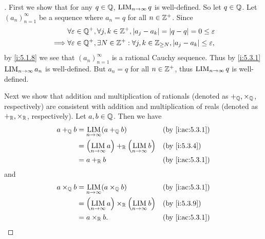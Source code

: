 \begin{proof}[]
  First we show that for any \(q \in \mathbb{Q}\), \(\operatorname*{LIM}_{n \to \infty} q\) is well-defined.
  So let \(q \in \mathbb{Q}\).
  Let \((a_n)_{n = 1}^\infty\) be a sequence where \(a_n = q\) for all \(n \in \mathbb{Z}^+\).
  Since
  \begin{align*}
             & \forall \varepsilon \in \mathbb{Q}^+, \forall j, k \in \mathbb{Z}^+, \left\lvert a_j - a_k\right\rvert = \left\lvert q - q\right\rvert = 0 \leq \varepsilon            \\
    \implies & \forall \varepsilon \in \mathbb{Q}^+, \exists N \in \mathbb{Z}^+ : \forall j, k \in \mathbb{Z}_{\geq N}, \left\lvert a_j - a_k\right\rvert \leq \varepsilon,
  \end{align*}
  by \cref{i:5.1.8} we see that \((a_n)_{n = 1}^\infty\) is a rational Cauchy sequence.
  Thus by \cref{i:5.3.1} \(\operatorname*{LIM}_{n \to \infty} a_n\) is well-defined.
  But \(a_n = q\) for all \(n \in \mathbb{Z}^+\), thus \(\operatorname*{LIM}_{n \to \infty} q\) is well-defined.

  Next we show that addition and multiplication of rationals (denoted as \(+_{\mathbb{Q}}, \times_{\mathbb{Q}}\), respectively) are consistent with addition and multiplication of reals (denoted as \(+_{\mathbb{R}}, \times_{\mathbb{R}}\), respectively).
  Let \(a, b \in \mathbb{Q}\).
  Then we have
  \begin{align*}
    a +_\Q b & = \LIM_{n \to \infty} (a +_\Q b)                             &  & \by{i:ac:5.3.1} \\
             & = \pa{\LIM_{n \to \infty} a} +_\R \pa{\LIM_{n \to \infty} b} &  & \by{i:5.3.4}    \\
             & = a +_\R b                                                   &  & \by{i:ac:5.3.1}
  \end{align*}
  and
  \begin{align*}
    a \times_\Q b & = \LIM_{n \to \infty} (a \times_\Q b)                             &  & \by{i:ac:5.3.1} \\
                  & = \pa{\LIM_{n \to \infty} a} \times_\R \pa{\LIM_{n \to \infty} b} &  & \by{i:5.3.9}    \\
                  & = a \times_\R b.                                                  &  & \by{i:ac:5.3.1}
  \end{align*}


\end{proof}

